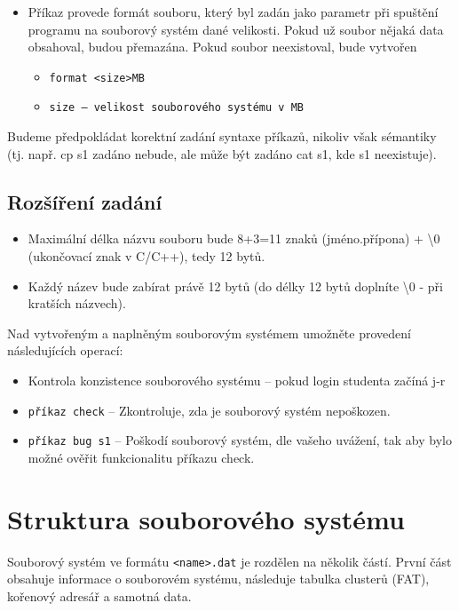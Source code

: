 \documentclass[12pt, a4paper]{article}
\begin{document}
\begin{itemize}[itemsep=-5pt]
\begin{itemize}
        \item[] \texttt{s1 -- soubor, ve kterém jsou příkazy}
    \end{itemize}
    \item Příkaz provede formát souboru, který byl zadán jako parametr při spuštění programu na souborový systém dané velikosti. Pokud už soubor nějaká data obsahoval, budou přemazána. Pokud soubor neexistoval, bude vytvořen
    \begin{itemize}
        \item[] \texttt{format <size>MB}
        \item[] \texttt{size -- velikost souborového systému v MB}
    \end{itemize}
\end{itemize}

Budeme předpokládat korektní zadání syntaxe příkazů, nikoliv však sémantiky (tj. např. cp s1 zadáno
nebude, ale může být zadáno cat s1, kde s1 neexistuje).

\subsection{Rozšíření zadání}
\begin{itemize}
    \item Maximální délka názvu souboru bude 8+3=11 znaků (jméno.přípona) + \textbackslash 0 (ukončovací znak v
    C/C++), tedy 12 bytů.
    \item Každý název bude zabírat právě 12 bytů (do délky 12 bytů doplníte \textbackslash 0 - při kratších názvech).
\end{itemize}

Nad vytvořeným a naplněným souborovým systémem umožněte provedení následujících operací:

\begin{itemize}
    \item[--] Kontrola konzistence souborového systému -- pokud login studenta začíná j-r
    \item[] \texttt{příkaz check} -- Zkontroluje, zda je souborový systém nepoškozen.
    \item[] \texttt{příkaz bug s1} -- Poškodí souborový systém, dle vašeho uvážení, tak aby bylo možné
    ověřit funkcionalitu příkazu check.
\end{itemize}

\pagebreak

\section{Struktura souborového systému}
Souborový systém ve formátu \texttt{<name>.dat} je rozdělen na několik částí. 
První část obsahuje informace o souborovém systému, následuje tabulka clusterů (FAT), kořenový adresář a samotná data.
\end{document}
